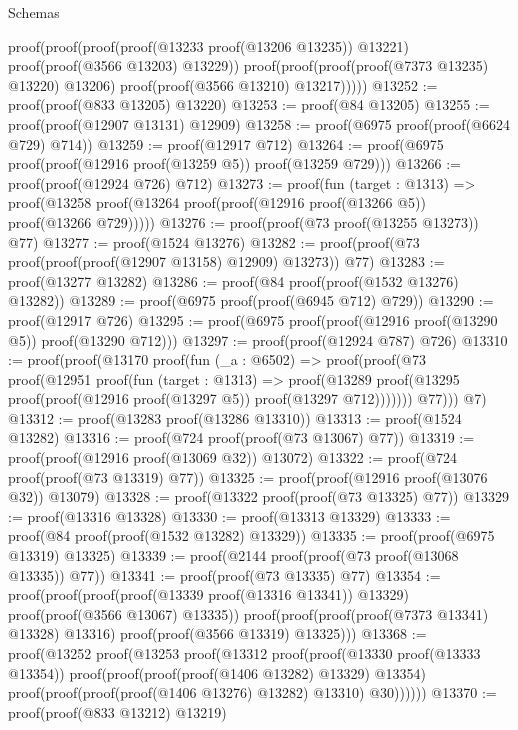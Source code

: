 \begin{lexlean}{Schemas}
\begin{coremodule}
          proof(proof(proof(proof(@13233 proof(@13206 @13235)) @13221)
                proof(proof(@3566 @13203) @13229))
              proof(proof(proof(proof(@7373 @13235) @13220) @13206)
                  proof(proof(@3566 @13210) @13217)))))
@13252 := proof(proof(@833 @13205) @13220)
@13253 := proof(@84 @13205)
@13255 := proof(proof(@12907 @13131) @12909)
@13258 := proof(@6975 proof(proof(@6624 @729) @714))
@13259 := proof(@12917 @712)
@13264 := proof(@6975 proof(proof(@12916 proof(@13259 @5)) proof(@13259 @729)))
@13266 := proof(proof(@12924 @726) @712)
@13273 := proof(fun (target : @1313) =>
    proof(@13258 proof(@13264 proof(proof(@12916 proof(@13266 @5)) proof(@13266 @729)))))
@13276 := proof(proof(@73 proof(@13255 @13273)) @77)
@13277 := proof(@1524 @13276)
@13282 := proof(proof(@73 proof(proof(proof(@12907 @13158) @12909) @13273)) @77)
@13283 := proof(@13277 @13282)
@13286 := proof(@84 proof(proof(@1532 @13276) @13282))
@13289 := proof(@6975 proof(proof(@6945 @712) @729))
@13290 := proof(@12917 @726)
@13295 := proof(@6975 proof(proof(@12916 proof(@13290 @5)) proof(@13290 @712)))
@13297 := proof(proof(@12924 @787) @726)
@13310 := proof(proof(@13170
        proof(fun (_a : @6502) =>
          proof(proof(@73
                proof(@12951
                    proof(fun (target : @1313) =>
                      proof(@13289
                          proof(@13295 proof(proof(@12916 proof(@13297 @5)) proof(@13297 @712)))))))
              @77)))
      @7)
@13312 := proof(@13283 proof(@13286 @13310))
@13313 := proof(@1524 @13282)
@13316 := proof(@724 proof(proof(@73 @13067) @77))
@13319 := proof(proof(@12916 proof(@13069 @32)) @13072)
@13322 := proof(@724 proof(proof(@73 @13319) @77))
@13325 := proof(proof(@12916 proof(@13076 @32)) @13079)
@13328 := proof(@13322 proof(proof(@73 @13325) @77))
@13329 := proof(@13316 @13328)
@13330 := proof(@13313 @13329)
@13333 := proof(@84 proof(proof(@1532 @13282) @13329))
@13335 := proof(proof(@6975 @13319) @13325)
@13339 := proof(@2144 proof(proof(@73 proof(@13068 @13335)) @77))
@13341 := proof(proof(@73 @13335) @77)
@13354 := proof(proof(proof(proof(@13339 proof(@13316 @13341)) @13329)
        proof(proof(@3566 @13067) @13335))
      proof(proof(proof(proof(@7373 @13341) @13328) @13316) proof(proof(@3566 @13319) @13325)))
@13368 := proof(@13252
      proof(@13253
          proof(@13312
              proof(proof(@13330 proof(@13333 @13354))
                  proof(proof(proof(proof(@1406 @13282) @13329) @13354)
                      proof(proof(proof(proof(@1406 @13276) @13282) @13310) @30))))))
@13370 := proof(proof(@833 @13212) @13219)

\end{coremodule}
\end{lexlean}
